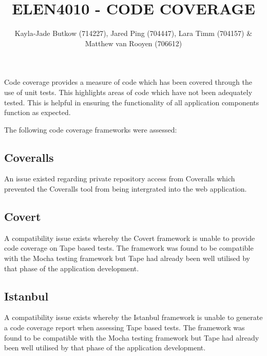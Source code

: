 \documentclass[10pt,onecolumn]{witseiepaper}
\title{ELEN4010 - CODE COVERAGE}
\author{Kayla-Jade Butkow (714227), Jared Ping (704447), Lara Timm (704157) \& Matthew van Rooyen (706612)}
\begin{document}
 
\maketitle
\pagestyle{plain}
\setcounter{page}{1}

Code coverage provides a measure of code which has been covered through the use of unit tests. This highlights areas of code which have not been adequately tested. This is helpful in ensuring the functionality of all application components function as expected.

The following code coverage frameworks were assessed:

\subsection*{\textbf{Coveralls}}
An issue existed regarding private repository access from Coveralls which prevented the Coveralls tool from being intergrated into the web application.

\subsection*{\textbf{Covert}}
A compatibility issue exists whereby the Covert framework is unable to provide code coverage on Tape based tests. The framework was found to be compatible with the Mocha testing framework but Tape had already been well utilised by that phase of the application development.

\subsection*{\textbf{Istanbul}}
A compatibility issue exists whereby the Istanbul framework is unable to generate a code coverage report when assessing Tape based tests. The framework was found to be compatible with the Mocha testing framework but Tape had already been well utilised by that phase of the application development.
\end{document}
